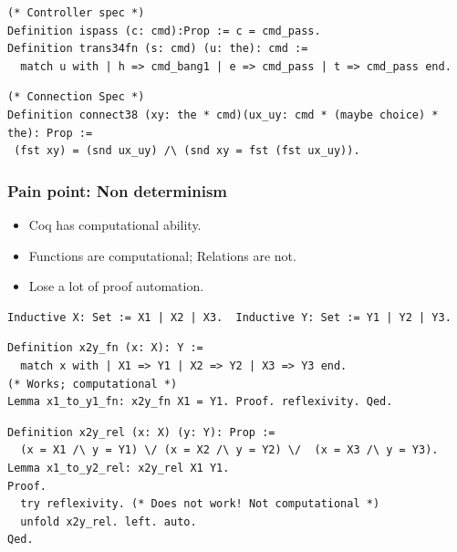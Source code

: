 \documentclass{beamer}
\begin{document}
\begin{frame}[fragile]
{\pause

\begin{verbatim}
(* Controller spec *)
Definition ispass (c: cmd):Prop := c = cmd_pass.
Definition trans34fn (s: cmd) (u: the): cmd :=
  match u with | h => cmd_bang1 | e => cmd_pass | t => cmd_pass end.
\end{verbatim}

\pause
\begin{verbatim}
(* Connection Spec *)
Definition connect38 (xy: the * cmd)(ux_uy: cmd * (maybe choice) * the): Prop := 
 (fst xy) = (snd ux_uy) /\ (snd xy = fst (fst ux_uy)).
\end{verbatim}
}
\end{frame}

\begin{frame}[fragile]
\frametitle{Pain point: Non determinism}
    \begin{itemize}
            \item Coq has computational ability.
            \item Functions are computational; Relations are not.
            \item Lose a lot of proof automation.
    \end{itemize}

\pause

{\footnotesize
\begin{verbatim}
Inductive X: Set := X1 | X2 | X3.  Inductive Y: Set := Y1 | Y2 | Y3. 
\end{verbatim}
\pause
\begin{verbatim}
Definition x2y_fn (x: X): Y :=
  match x with | X1 => Y1 | X2 => Y2 | X3 => Y3 end.
(* Works; computational *)
Lemma x1_to_y1_fn: x2y_fn X1 = Y1. Proof. reflexivity. Qed.
\end{verbatim}
\pause

\begin{verbatim}
Definition x2y_rel (x: X) (y: Y): Prop :=
  (x = X1 /\ y = Y1) \/ (x = X2 /\ y = Y2) \/  (x = X3 /\ y = Y3).
Lemma x1_to_y2_rel: x2y_rel X1 Y1.
Proof.
  try reflexivity. (* Does not work! Not computational *)
  unfold x2y_rel. left. auto.
Qed.
\end{verbatim}
}
\end{frame}
\end{document}
